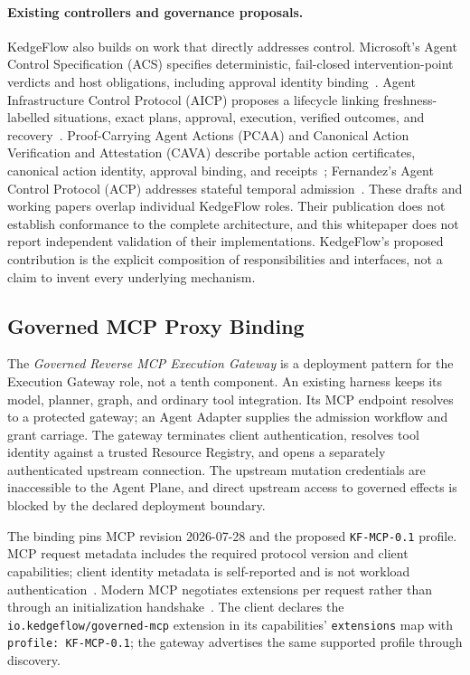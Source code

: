 \paragraph{Existing controllers and governance proposals.}
KedgeFlow also builds on work that directly addresses control. Microsoft's Agent Control Specification (ACS) specifies deterministic, fail-closed intervention-point verdicts and host obligations, including approval identity binding~\cite{acs2026}. Agent Infrastructure Control Protocol (AICP) proposes a lifecycle linking freshness-labelled situations, exact plans, approval, execution, verified outcomes, and recovery~\cite{aicp2026}. Proof-Carrying Agent Actions (PCAA) and Canonical Action Verification and Attestation (CAVA) describe portable action certificates, canonical action identity, approval binding, and receipts~\cite{pcaa2026,cava2026}; Fernandez's Agent Control Protocol (ACP) addresses stateful temporal admission~\cite{fernandezacp2026}. These drafts and working papers overlap individual KedgeFlow roles. Their publication does not establish conformance to the complete architecture, and this whitepaper does not report independent validation of their implementations. KedgeFlow's proposed contribution is the explicit composition of responsibilities and interfaces, not a claim to invent every underlying mechanism.

\subsection{Governed MCP Proxy Binding}
\label{sec:governed-mcp}

The \emph{Governed Reverse MCP Execution Gateway} is a deployment pattern for the Execution Gateway role, not a tenth component. An existing harness keeps its model, planner, graph, and ordinary tool integration. Its MCP endpoint resolves to a protected gateway; an Agent Adapter supplies the admission workflow and grant carriage. The gateway terminates client authentication, resolves tool identity against a trusted Resource Registry, and opens a separately authenticated upstream connection. The upstream mutation credentials are inaccessible to the Agent Plane, and direct upstream access to governed effects is blocked by the declared deployment boundary.

The binding pins MCP revision 2026-07-28 and the proposed \texttt{KF-MCP-0.1} profile. MCP request metadata includes the required protocol version and client capabilities; client identity metadata is self-reported and is not workload authentication~\cite{mcpbase2026}. Modern MCP negotiates extensions per request rather than through an initialization handshake~\cite{mcpversion2026}. The client declares the \texttt{io.kedgeflow/governed-mcp} extension in its capabilities' \texttt{extensions} map with \texttt{profile: KF-MCP-0.1}; the gateway advertises the same supported profile through discovery.


